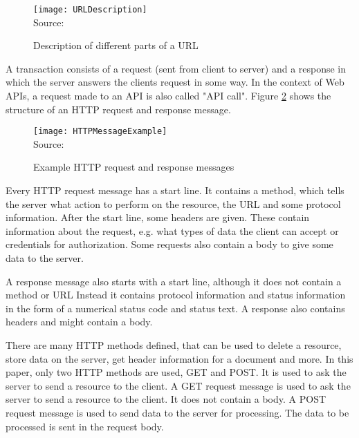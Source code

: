 \begin{figure}[H]
    \caption{Description of different parts of a URL}
	\label{fig:Description of different parts of a URL}
    \texttt{[image: URLDescription]}
    \\
    Source: \cite[24]{gourley2002http}
\end{figure}

A transaction consists of a request (sent from client to server) and a response in which the
server answers the clients request in some way.\cite[8]{gourley2002http}
In the context of Web APIs, a request made to an API is also called "API call".\cite{StoplightAPITypes}
Figure \ref{fig:Example HTTP request and response messages} shows the structure of an 
HTTP request and response message.

\begin{figure}[H]
    \caption{Example HTTP request and response messages}
	\label{fig:Example HTTP request and response messages}
    \texttt{[image: HTTPMessageExample]}
    \\
    Source: \cite[47]{gourley2002http}
\end{figure}

Every HTTP request message has a start line.
It contains a method, which tells the server what action to perform on the resource, the URL
and some protocol information.\cite[47]{gourley2002http}
After the start line, some headers are given. These contain information about the request,
e.g. what types of data the client can accept or credentials for authorization.
Some requests also contain a body to give some data to the server. \cite[52]{gourley2002http}

A response message also starts with a start line, although it does not contain a method or URL
Instead it contains protocol information and status information in the form of a numerical
status code and status text.\cite[48]{gourley2002http}
A response also contains headers and might contain a body.\cite[52]{gourley2002http}

There are many HTTP methods defined, that can be used to delete a resource, store
data on the server, get header information for a document and more.\cite[48]{gourley2002http}
In this paper, only two HTTP methods are used, GET and POST.
It is used to ask the server to send a resource to the client.
A GET request message is used to ask the server to send a resource to the client.
It does not contain a body.\cite[48]{gourley2002http}
A POST request message is used to send data to the server for processing. The data to be
processed is sent in the request body.\cite[48]{gourley2002http}

